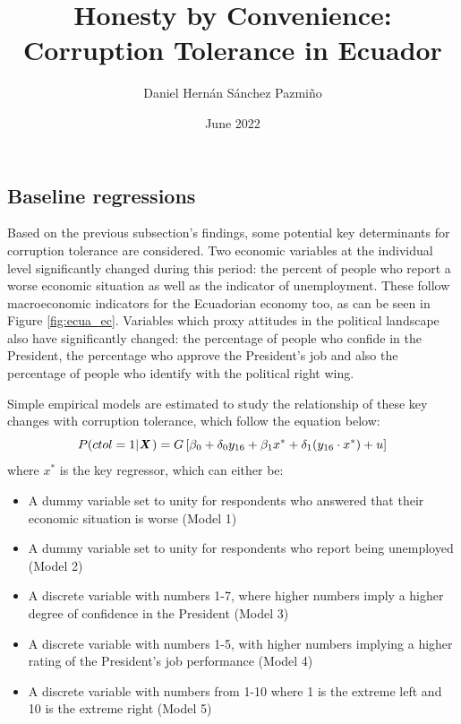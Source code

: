 \documentclass[12pt,a4]{article}
\title{Honesty by Convenience: Corruption Tolerance in Ecuador}
\author{Daniel Hernán Sánchez Pazmiño}
\date{June 2022}
\begin{document}

\subsection{Baseline regressions}
\label{subsec:fin2}

Based on the previous subsection's findings, some potential key determinants for corruption tolerance are considered. Two economic variables at the individual level significantly changed during this period: the percent of people who report a worse economic situation as well as the indicator of unemployment. These follow macroeconomic indicators for the Ecuadorian economy too, as can be seen in Figure \ref{fig:ecua_ec}. Variables which proxy attitudes in the political landscape also have significantly changed: the percentage of people who confide in the President, the percentage who approve the President's job and also the percentage of people who identify with the political right wing.

Simple empirical models are estimated to study the relationship of these key changes with corruption tolerance, which follow the equation below:
\begin{equation}
\label{eqn:simplemod}
P(ctol = 1 | \textbf{\textit{X}} \hspace{0.04cm}) = G \left[ \beta_0 + \delta_0 y_{16} + \beta_1 x^* + \delta_1 (y_{16} \cdot x^*) + u\right]
\end{equation}
where $x^*$ is the key regressor, which can either be: 
\begin{itemize}
  \item A dummy variable set to unity for respondents who answered that their economic situation is worse (Model 1)
  \item A dummy variable set to unity for respondents who report being unemployed (Model 2)
  \item A discrete variable with numbers 1-7, where higher numbers imply a higher degree of confidence in the President (Model 3)
  \item A discrete variable with numbers 1-5, with higher numbers implying a higher rating of the President's job performance (Model 4)
  \item A discrete variable with numbers from 1-10 where 1 is the extreme left and 10 is the extreme right (Model 5)
\end{itemize}
\end{document}

